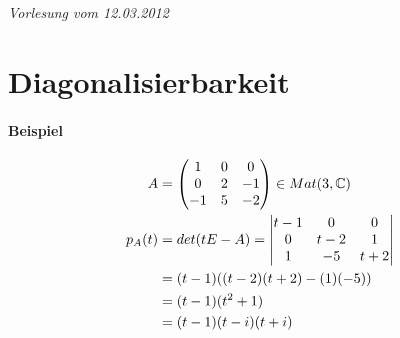
\newpage
\noindent \textit{Vorlesung vom 12.03.2012}
\section{Diagonalisierbarkeit}
\paragraph{Beispiel}
\begin{align}
A &= \begin{pmatrix} 1 & 0 & 0 \\ 0 & 2 & -1 \\ -1 & 5 & -2 \end{pmatrix} \in Mat(3, \mathbb{C}) \\
p_A(t) &= det(tE-A) = \begin{vmatrix} t-1 & 0 & 0 \\ 0 & t-2 & 1 \\ 1 & -5 & t+2 \end{vmatrix} \\
&= (t-1)((t-2)(t+2)-(1)(-5)) \\
&= (t-1)(t^2+1) \\
&= (t-1)(t-i)(t+i)
\end{align}
